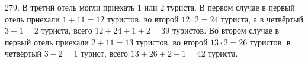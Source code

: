 279. В третий отель могли приехать 1 или 2 туриста. В первом случае в первый отель приехали $1+11=12$ туристов, во второй $12\cdot2=24$ туриста, а в четвёртый $3-1=2$ туриста, всего $12+24+1+2=39$ туристов. Во втором случае в первый отель приехали $2+11=13$ туристов, во второй $13\cdot2=26$ туристов, в четвёртый $3-2=1$ турист, всего $13+26+2+1=42$ туриста.\\
